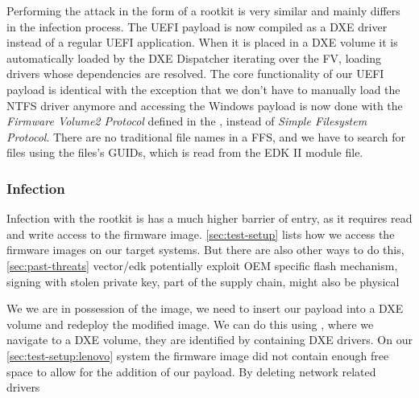 Performing the attack in the form of a rootkit is very similar and mainly differs in the infection process.
The \ac{UEFI} payload is now compiled as a \ac{DXE} driver instead of a regular \ac{UEFI} application.
When it is placed in a \ac{DXE} volume it is automatically loaded by the \ac{DXE} Dispatcher iterating over the \ac{FV}, loading  drivers whose dependencies are resolved.
The core functionality of our \ac{UEFI} payload is identical with the exception that we don't have to manually load the \ac{NTFS} driver anymore and accessing the Windows payload is now done with the \emph{Firmware Volume2 Protocol} defined in the \cite[Section 3.4.1]{pi-spec}, instead of \emph{Simple Filesystem Protocol}.
There are no traditional file names in a \ac{FFS}, and we have to search for files using the files's \acp{GUID}, which is read from the \ac{EDK} II module file.

\subsubsection{Infection}

Infection with the rootkit is has a much higher barrier of entry, as it requires read and write access to the firmware image.
\autoref{sec:test-setup} lists how we access the firmware images on our target systems.
But there are also other ways to do this, \autoref{sec:past-threats} vector\-/edk potentially exploit \ac{OEM} specific flash mechanism, signing with stolen private key, part of the supply chain, might also be physical 

We we are in possession of the image, we need to insert our payload into a \ac{DXE} volume and redeploy the modified image.
We can do this using , where we navigate to a \ac{DXE} volume, they are identified by containing \ac{DXE} drivers.
On our \autoref{sec:test-setup:lenovo} system the firmware image did not contain enough free space to allow for the addition of our payload.
By deleting network related drivers

